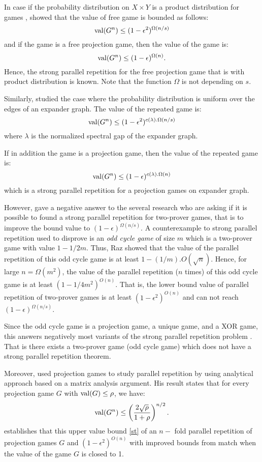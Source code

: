 In case if the probability distribution on $X \times Y$ is a product distribution  for games , \cite{barak2009strong}  showed that the value of free game is bounded  as follows:
 $$\mathrm{val} (G^n) \leq (1-\epsilon^2)^{\Omega(n/s)}$$
 and if the game is a free projection game, then the value of the game is: $$\mathrm{val} (G^n) \leq (1-\epsilon)^{\Omega(n)}.$$
Hence, the strong parallel repetition for the free projection game that is with product distribution is known. Note that the function $\Omega$ is not depending on $s.$

Similarly, \cite{raz2012strong} studied the case where the probability distribution is uniform over the edges of an expander graph. The value of the repeated game is:
$$\mathrm{val} (G^n) \leq (1-\epsilon^2)^{c(\lambda). \Omega(n/s)}$$ where $\lambda$ is the normalized spectral gap of the expander  graph. 

If in addition the game is a projection game, then the value of the repeated game is: $$\mathrm{val} (G^n) \leq (1-\epsilon)^{c(\lambda). \Omega(n)}$$ which is  a strong parallel repetition for a projection games on expander graph.

However, \cite{raz2011counterexample} gave a negative answer to the several research who are asking if it is possible to found a strong parallel repetition for two-prover games, that is to improve the bound value to  $(1-\epsilon)^{\Omega(n/s)}.$ A counterexample to strong parallel repetition used to disprove is an \textit{odd cycle game} of size $m$ which is a two-prover game with value $1-1/2m.$ Thus, Raz showed that
the value of the parallel repetition of this odd cycle game is at least $1-(1/m).O(\sqrt{n})$. Hence, for large $n = \Omega(m^2)$, the value of  the parallel repetition ($n$ times) of this odd cycle game is at least $(1-1/4m^2)^{O(n)}$.
That is, the lower bound value of parallel repetition of two-prover games is at least $(1-\epsilon^2)^{O(n)}$ and can not reach $(1-\epsilon)^{\Omega(n/s)}.$

Since the odd cycle game is a projection game, a unique game, and a XOR game, this answers negatively most
variants of the strong parallel repetition problem \citep{raz2011counterexample, raz2012strong}. That is there exists a two-prover game (odd cycle game) which does not have a strong parallel repetition theorem. 

Moreover, \cite{dinur2014analytical} used projection games to study parallel repetition by using analytical approach based on a matrix analysis argument. His result states that for every projection game $G$ with $\mathrm{val} (G) \leq \rho$, we have:  \begin{align}
\mathrm{val} (G^n) \leq \left(\frac{2\sqrt{\rho}}{1+\rho} \right)^{n/2}. \label{st}
\end{align}
\cite{dinur2014analytical} establishes that this upper value  bound \eqref{st} of an $n-$ fold parallel repetition of projection games $G$ and  $(1-\epsilon^2)^{O(n)}$  
with improved bounds from  \cite{rao2011parallel} match when the value of the game $G$ is closed to 1.

